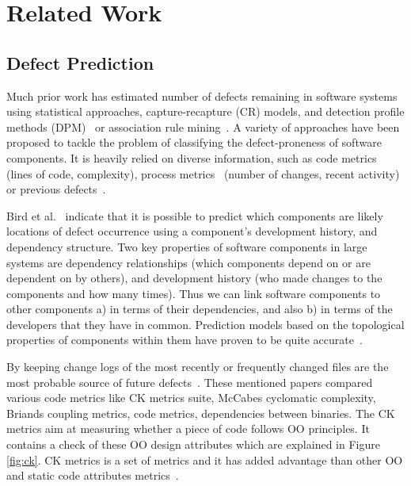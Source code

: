 \documentclass[sigconf,review, anonymous]{acmart}
\theoremstyle{break}
\theoremstyle{break}
\begin{document}
\section{Related Work}
\subsection{Defect Prediction}
\label{sect:review}

Much prior work has estimated number of defects remaining in software systems~\cite{hall2012systematic} using statistical approaches, capture-recapture 
(CR) models, and detection profile methods (DPM)~\cite{song2011general} or
association rule mining~\cite{song2006software}. A variety of approaches have been proposed to tackle the problem of classifying the defect-proneness of software components. It is heavily relied on diverse information, such as code metrics~\cite{d2010extensive,menzies2007data, nagappan2006mining,shepperd2014researcher,Menzies2010} (lines of code, complexity), process metrics~\cite{hassan2009predicting} (number of changes, recent activity) or previous defects~\cite{kim2007predicting}.

Bird et al.~\cite{bird2009putting} indicate that it is possible to predict which components are likely locations of
defect occurrence using a component's development history,
and dependency structure. Two key properties of software components
in large systems are dependency relationships (which components
depend on or are dependent on by others), and development
history (who made changes to the components and
how many times). Thus we can link software components
to other components a) in terms of their dependencies, and
also b) in terms of the developers that they have in common. Prediction models based on the topological properties
of components within them have proven to be quite
accurate~\cite{zimmermann2008predicting}.

By keeping change logs of the most recently or frequently changed files are the most probable source of future defects~\cite{hall2012systematic, catal2009systematic}. These mentioned papers compared various code metrics like CK  metrics  suite,  
McCabes  cyclomatic  complexity, Briands coupling metrics, code metrics, 
dependencies between  binaries. The CK metrics aim at measuring whether a 
piece of code follows OO principles. It contains a check of these OO design 
attributes which are explained in Figure \ref{fig:ck}. CK metrics is a set
of metrics and it has added advantage than other OO and static code attributes metrics~\cite{d2010extensive}. 
\end{document}
